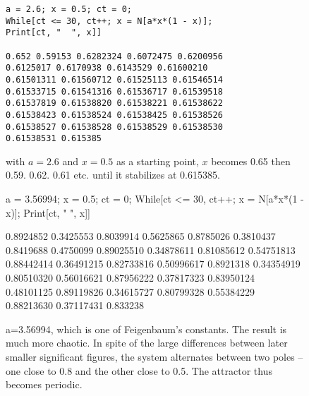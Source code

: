 \documentclass{article}
\begin{document}
\begin{figure}[h]
\begin{lstlisting}
a = 2.6; x = 0.5; ct = 0;
While[ct <= 30, ct++; x = N[a*x*(1 - x)];
Print[ct, "  ", x]]

0.652 0.59153 0.6282324 0.6072475 0.6200956
0.6125017 0.6170938 0.6143529 0.61600210 
0.61501311 0.61560712 0.61525113 0.61546514
0.61533715 0.61541316 0.61536717 0.61539518 
0.61537819 0.61538820 0.61538221 0.61538622
0.61538423 0.61538524 0.61538425 0.61538526
0.61538527 0.61538528 0.61538529 0.61538530
0.61538531 0.615385
\end{lstlisting}
\caption{with $a=2.6$ and $x=0.5$ as a starting point, $x$ becomes 0.65 then 0.59. 0.62. 0.61
etc.
until it stabilizes at 0.615385.}
\end{figure}
\begin{figure}[h]
a = 3.56994; x = 0.5; ct = 0;
While[ct <= 30, ct++; x = N[a*x*(1 - x)];
Print[ct, "  ", x]]

0.8924852 0.3425553 0.8039914 0.5625865
0.8785026 0.3810437 0.8419688 0.4750099
0.89025510 0.34878611 0.81085612 0.54751813
0.88442414 0.36491215 0.82733816 0.50996617 
0.8921318 0.34354919 0.80510320 0.56016621
0.87956222 0.37817323 0.83950124 0.48101125 
0.89119826 0.34615727 0.80799328 0.55384229 
0.88213630 0.37117431 0.833238
\caption{a=3.56994, which is one of Feigenbaum's constants.  The result is
much more chaotic. In spite of the large differences between later
smaller significant figures, the system alternates between two poles -- one
close to 0.8 and the other close to 0.5.  The attractor thus becomes
periodic.}
\end{figure}
\end{document}
